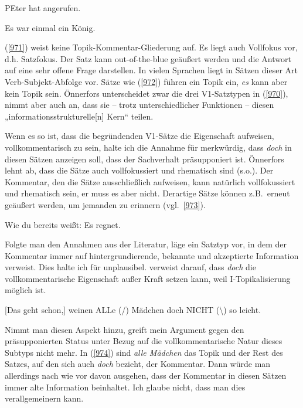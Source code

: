 {\begin{exe}
	\ex\label{971}
	PEter hat angerufen.
\end{exe}

\begin{exe}
	\ex\label{972}
	Es war einmal ein König.
	\hfill\hbox{\citet[305]{Oennerfors1997a}}
\end{exe}
(\ref{971}) weist keine Topik-Kommentar-Gliederung auf. Es liegt auch Vollfokus vor, d.h.  Satzfokus. Der Satz kann out-of-the-blue  geäußert werden und die Antwort auf eine sehr offene Frage darstellen. In vielen Sprachen liegt in Sätzen dieser Art Verb-Subjekt-Abfolge vor. Sätze wie (\ref{972}) führen ein Topik ein, \textit{es} kann aber kein Topik sein. Önnerfors unterscheidet zwar die drei V1-Satztypen in (\ref{970}), nimmt aber auch an, dass sie – trotz unterschiedlicher Funktionen – diesen „in\-for\-ma\-tions\-struk\-tur\-elle[n] Kern“ teilen.

Wenn es so ist, dass die begründenden V1-Sätze die Eigenschaft aufweisen, vollkommentarisch zu sein, halte ich die Annahme für merkwürdig, dass \textit{doch} in diesen Sätzen anzeigen soll, dass der Sachverhalt präsupponiert  ist. Önnerfors lehnt ab,  dass die Sätze auch vollfokussiert und rhematisch sind (s.o.). Der Kommentar, den die Sätze ausschließlich aufweisen, kann natürlich vollfokussiert und rhematisch sein, er muss es aber nicht. Derartige Sätze können z.B.\ erneut geäußert werden, um jemanden zu erinnern (vgl.\ \ref{973}).

\begin{exe}
	\ex\label{973}
	Wie du bereits weißt: Es regnet.
\end{exe}
Folgte man den Annahmen aus der Literatur, läge ein Satztyp vor, in dem der Kommentar immer auf hintergrundierende, bekannte und akzeptierte Information verweist. Dies halte ich für unplausibel. \citet[223, Fn 22]{Reis2000} verweist darauf, dass \textit{doch} die vollkommentarische Eigenschaft außer Kraft setzen kann, weil I-Topikalisierung  möglich ist.

\begin{exe}
	\ex\label{974}
	[Das geht schon,] weinen ALLe (/) Mädchen doch NICHT (\textbackslash) so leicht.
\end{exe}
Nimmt man diesen Aspekt hinzu, greift mein Argument gegen den präsupponier\-ten  Status unter Bezug auf die vollkommentarische Natur dieses Subtyps nicht mehr. In (\ref{974}) sind \textit{alle Mädchen} das Topik  und der Rest des Satzes, auf den sich auch \textit{doch} bezieht, der Kommentar. Dann würde man allerdings nach wie vor davon ausgehen, dass der Kommentar  in diesen Sätzen immer alte Information beinhaltet. Ich glaube nicht, dass man dies verallgemeinern kann.

}
